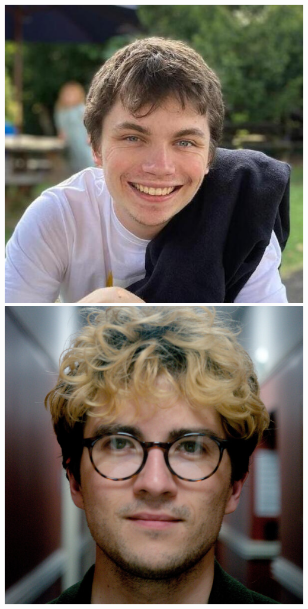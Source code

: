 \documentclass[aspectratio=169]{beamer}
\begin{document}
\begin{frame}
{        \includegraphics[width=0.09\textheight]{people/harry_bevins.jpg}%
        \includegraphics[width=0.09\textheight]{people/harvey_williams.jpg}%
}
\end{frame}
\end{document}
